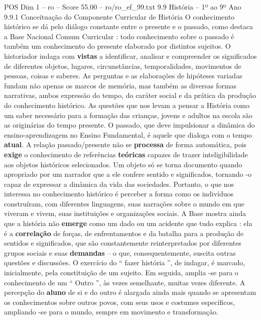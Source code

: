 \begin{textsample}{POS Dim 1 – ro – Score 55.00 – ro/ro\_ef\_99.txt}  \label{ex:f1_pos_138}
9.9 História – 1º ao 9º Ano 9.9.1 Conceituação do Componente Curricular de História O conhecimento histórico se dá pelo diálogo constante entre o presente e o passado, como destaca a Base Nacional Comum Curricular : todo conhecimento sobre o passado é também um conhecimento do presente elaborado por distintos sujeitos.
O historiador indaga com \textbf{vistas} a identificar, analisar e compreender os significados de diferentes objetos, lugares, circunstâncias, temporalidades, movimentos de pessoas, coisas e saberes.
As perguntas e as elaborações de hipóteses variadas fundam não apenas os marcos de memória, mas também as diversas formas narrativas, ambos expressão do tempo, do caráter social e da prática da produção do conhecimento histórico.
As questões que nos levam a pensar a História como um saber necessário para a formação das crianças, jovens e adultos na escola são as originárias do tempo presente.
O passado, que deve impulsionar a dinâmica do ensino-aprendizagem no Ensino Fundamental, é aquele que dialoga com o tempo \textbf{atual}.
A relação passado/presente não se \textbf{processa} de forma automática, pois \textbf{exige} o conhecimento de referências \textbf{teóricas} capazes de trazer inteligibilidade aos objetos históricos selecionados.
Um objeto só se torna documento quando apropriado por um narrador que a ele confere sentido e significados, tornando -o capaz de expressar a dinâmica da vida das sociedades.
Portanto, o que nos interessa no conhecimento histórico é perceber a forma como os indivíduos construíram, com diferentes linguagens, suas narrações sobre o mundo em que viveram e vivem, suas instituições e organizações sociais.
A Base mostra ainda que a história não \textbf{emerge} como um dado ou um acidente que tudo explica : ela é a \textbf{correlação} de forças, de enfrentamentos e da batalha para a produção de sentidos e significados, que são constantemente reinterpretados por diferentes grupos sociais e suas \textbf{demandas} – o que, consequentemente, suscita outras questões e discussões.
O exercício do “ fazer história ”, de indagar, é marcado, inicialmente, pela constituição de um sujeito.
Em seguida, amplia -se para o conhecimento de um “ Outro ”, às vezes semelhante, muitas vezes diferente.
A percepção do \textbf{aluno} de si e do outro é alargada ainda mais quando se apresentam os conhecimentos sobre outros povos, com seus usos e costumes específicos, ampliando -se para o mundo, sempre em movimento e transformação.

\end{textsample}
